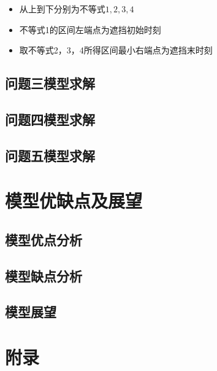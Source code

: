 \documentclass{article}
\begin{document}
\begin{itemize}
    \item 从上到下分别为不等式$1,2,3,4$
    \item 不等式1的区间左端点为遮挡初始时刻
    \item 取不等式2，3，4所得区间最小右端点为遮挡末时刻
\end{itemize}
\subsection{问题三模型求解}

\subsection{问题四模型求解}

\subsection{问题五模型求解}

\section{模型优缺点及展望}

\subsection{模型优点分析}

\subsection{模型缺点分析}

\subsection{模型展望}




\section*{附录}
\vspace{-1em}


\noindent
\end{document}
